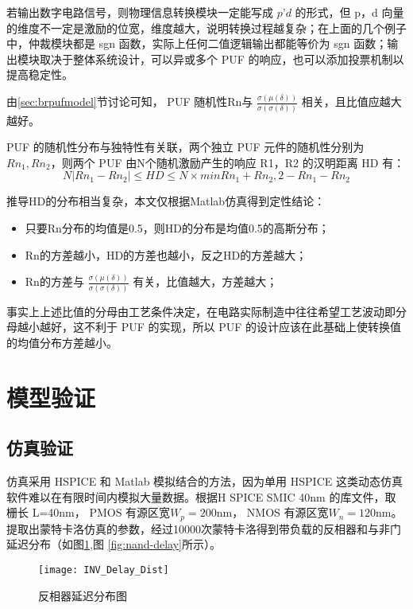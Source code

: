 若输出数字电路信号，则物理信息转换模块一定能写成 $ p’d $ 的形式，但 p，d 向量的维度不一定是激励的位宽，维度越大，说明转换过程越复杂；在上面的几个例子中，仲裁模块都是 sgn 函数，实际上任何二值逻辑输出都能等价为 sgn 函数；输出模块取决于整体系统设计，可以异或多个 PUF 的响应，也可以添加投票机制以提高稳定性\supercite{mathew201416}。

由\ref{sec:brpufmodel}节讨论可知， PUF 随机性Rn与 $ \frac{\sigma(\mu(\delta))}{\sigma(\sigma(\delta))} $ 相关，且比值应越大越好。

PUF 的随机性分布与独特性有关联，两个独立 PUF 元件的随机性分别为$ Rn_1,Rn_2 $，则两个 PUF 由N个随机激励产生的响应 R1，R2 的汉明距离 HD 有：
\begin{equation}
N|Rn_1-Rn_2|\leq HD\leq N\times min{Rn_1+Rn_2,2-Rn_1-Rn_2}
\end{equation}

推导HD的分布相当复杂，本文仅根据Matlab仿真得到定性结论：
\begin{itemize}
\item 只要Rn分布的均值是0.5，则HD的分布是均值0.5的高斯分布；
\item Rn的方差越小，HD的方差也越小，反之HD的方差越大；
\item Rn的方差与 $ \frac{\sigma(\mu(\delta))}{\sigma(\sigma(\delta))} $ 有关，比值越大，方差越大；
\end{itemize}

事实上上述比值的分母由工艺条件决定，在电路实际制造中往往希望工艺波动即分母越小越好，这不利于 PUF 的实现，所以 PUF 的设计应该在此基础上使转换值的均值分布方差越小。


\section{模型验证}\label{sec:modelverify}
\subsection{仿真验证}\label{subsec:simu}
仿真采用 HSPICE 和 Matlab 模拟结合的方法，因为单用 HSPICE 这类动态仿真软件难以在有限时间内模拟大量数据。根据H SPICE SMIC 40nm 的库文件，取栅长 L=40nm， PMOS 有源区宽$ W_p=200 $nm， NMOS 有源区宽$ W_n=120 $nm。提取出蒙特卡洛仿真的参数，经过10000次蒙特卡洛得到带负载的反相器和与非门延迟分布（如图\ref{fig:inv-delay},图 \ref{fig:nand-delay}所示）。

\begin{figure}[htb!]
\centering
\texttt{[image: INV\_Delay\_Dist]}
\caption{反相器延迟分布图}
\label{fig:inv-delay}
\end{figure}

